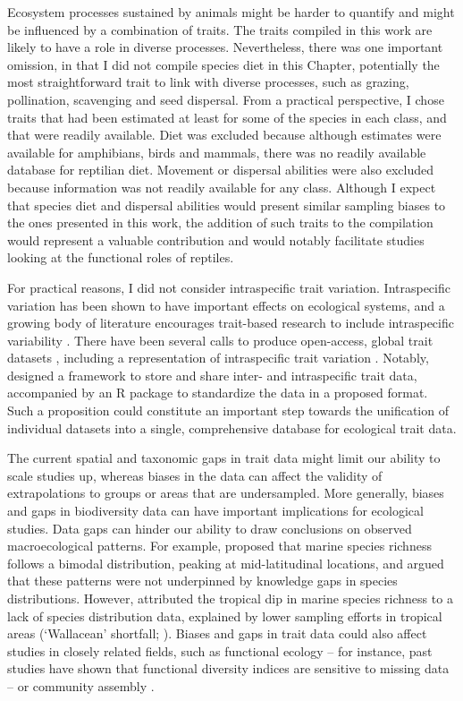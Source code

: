 Ecosystem processes sustained by animals might be harder to quantify and might be influenced by a combination of traits. The traits compiled in this work are likely to have a role in diverse processes. Nevertheless, there was one important omission, in that I did not compile species diet in this Chapter, potentially the most straightforward trait to link with diverse processes, such as grazing, pollination, scavenging and seed dispersal. From a practical perspective, I chose traits that had been estimated at least for some of the species in each class, and that were readily available. Diet was excluded because although estimates were available for amphibians, birds and mammals, there was no readily available database for reptilian diet. Movement or dispersal abilities were also excluded because information was not readily available for any class. Although I expect that species diet and dispersal abilities would present similar sampling biases to the ones presented in this work, the addition of such traits to the compilation would represent a valuable contribution and would notably facilitate studies looking at the functional roles of reptiles.

For practical reasons, I did not consider intraspecific trait variation. Intraspecific variation has been shown to have important effects on ecological systems, and a growing body of literature encourages trait-based research to include intraspecific variability \citep{Guralnick2016}. There have been several calls to produce open-access, global trait datasets \citep{Weiss2019}, including a representation of intraspecific trait variation \citep{Kissling2018}. Notably, \citet{Schneider2019} designed a framework to store and share inter- and intraspecific trait data, accompanied by an R package to standardize the data in a proposed format. Such a proposition could constitute an important step towards the unification of individual datasets into a single, comprehensive database for ecological trait data.

The current spatial and taxonomic gaps in trait data might limit our ability to scale studies up, whereas biases in the data can affect the validity of extrapolations to groups or areas that are undersampled. More generally, biases and gaps in biodiversity data can have important implications for ecological studies. Data gaps can hinder our ability to draw conclusions on observed macroecological patterns. For example, \citet{CHAUDHARY2016} proposed that marine species richness follows a bimodal distribution, peaking at mid-latitudinal locations, and argued that these patterns were not underpinned by knowledge gaps in species distributions. However, \citet{Menegotto2018} attributed the tropical dip in marine species richness to a lack of species distribution data, explained by lower sampling efforts in tropical areas (`Wallacean' shortfall; \citet{Hortal2015}). Biases and gaps in trait data could also affect studies in closely related fields, such as functional ecology -- for instance, past studies have shown that functional diversity indices are sensitive to missing data \citep{Majekova2016, Pakeman2014} -- or community assembly \citep{Perronne2017}.

